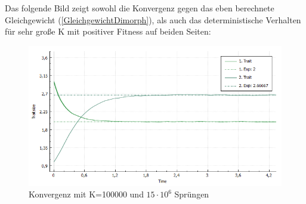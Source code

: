 \documentclass[11pt, a4paper, german]{article}
\theoremstyle{plain}
\begin{document}
		
		Das folgende Bild zeigt sowohl die Konvergenz gegen das eben berechnete Gleichgewicht (\ref{GleichgewichtDimorph}), als auch das deterministische Verhalten für sehr große K mit positiver Fitness auf beiden Seiten:
		\begin{figure}[H]
			\centering
			\includegraphics[width=1\linewidth]{./Pictures/BigKInstance_Equillibrium}
			\caption[Konvergenz_K=100000]{Konvergenz mit K=100000 und $ 15\cdot10^6 $ Sprüngen}
			\label{Konvergenz_K=100000}
		\end{figure}
	
\end{document}
